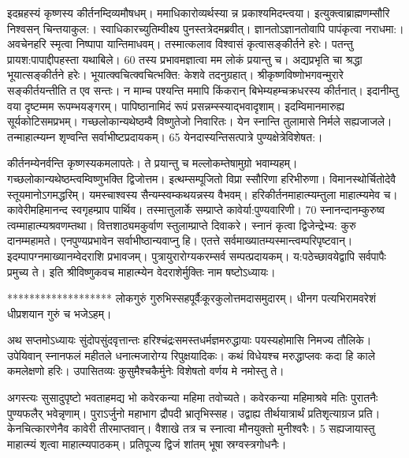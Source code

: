 इदम्रहस्यं कृष्णस्य कीर्तनम्दिव्यमौषधम्।
 ममाधिकारोव्यर्थस्या न्न प्रकाश्यमिदम्त्वया।
 इत्युक्त्वाब्राह्मणम्सौरि निश्वसन् चिन्तयाकुल:।
 स्वाधिकारच्युतिम्वीक्ष्य पुनस्तत्रेदमब्रवीत्।
 ज्ञानतोऽज्ञानतोवापि पापंकृत्वा नराधमा:।
 अवचेनहरि स्मृत्वा निष्पापा यान्तिमाधवम्।
 तस्मात्कलाव विश्वासं कृत्वासङ्कीर्तने हरेः।
 पतन्तु प्रायश:पापाद्दीपहस्ता यथाबिले।
 60 तस्य प्रभावमज्ञात्वा मम लोकं प्रयान्तु च।
 अद्यप्रभृति चा श्रद्धा भूयात्सङ्कीर्तने हरेः।
 भूयात्क्वचित्क्वचित्भक्ति: केशवे तदनुग्रहात्।
 श्रीकृष्णविष्णोभगवन्मुरारे
सङ्कीर्तयन्तीति त एव सन्तः।
 न माम्च पश्यन्ति ममापि
किंकरान् बिभेम्यहम्चक्रधरस्य कीर्तनात्।
 इदानीम्तु वया दृष्टम्मम रूपम्भयङ्गरम्।
 पापिष्ठानामिदं रूपं प्रसन्नम्स्स्याद्भवादृशाम्।
 इदम्विमानमारुह्य सूर्यकोटिसमप्रभम्।
 गच्छलोकान्यथेष्ठम्वै विष्णुतेजो निवारितः।
 येन स्नान्ति तुलामासे निर्मले सह्यजाजले।
 तन्माहात्म्यम्न शृण्वन्ति सर्वाभीष्टप्रदायकम्।
 65 येनदास्यन्तिसत्पात्रे पुण्यक्षेत्रेविशेषत:।
 
कीर्तनम्येनर्वन्ति कृष्णस्यकमलापतेः।
 ते प्रयान्तु च मल्लोकम्तेषामुग्रो भवाम्यहम्।
 गच्छलोकान्यथेष्ठम्त्वम्विष्णुभक्ति द्विजोत्तम।
 इत्थम्सम्पूजितो विप्रा स्सौरिणा हरिभीरुणा।
 विमानस्थोर्चितोदेवै स्तूयमानोऽगमद्धरिम्।
 यमस्चाश्वस्य सैन्यम्स्वम्कथयन्नस्य वैभवम्।
 हरिकीर्तनमाहात्म्यम्तुला माहात्म्यमेव च।
 कावेरीमहिमानन्द स्वगृहम्प्राप पार्थिव।
 तस्मात्तुलार्के सम्प्राप्ते कावेर्या:पुण्यवारिणी।
 70 स्नानन्दानम्कुरुष्व त्वम्माहात्म्यश्रवणम्तथा।
 वित्तशाठ्यमकुर्वाण स्तुलाम्प्राप्ते दिवाकरे।
 स्नानं कृत्वा द्विजेन्द्रेभ्य: कुरु दानम्महामते।
 एनपुण्यप्रभावेन सर्वाभीष्ठान्यवाप्नु हि।
 एतत्ते सर्वमाख्यातम्यस्मान्त्वम्परिपृष्टवान्।
 इदम्पापग्नमाख्यानम्वेदराशि प्रभावजम्।
 पुत्रायुरारोग्यकरम्सर्व सम्पत्प्रदायकम्।
 य:पठेच्छावयेद्वापि सर्वपापैः प्रमुच्य ते।
 इति श्रीविष्णुकवच माहात्म्येन वेदराशेर्मुक्तिः नाम
षष्टोऽध्यायः।

*******************
लोकगुरुं गुरुभिस्सहपूर्वैःकूरकुलोत्तमदासमुदारम्।
 धीनग पत्यभिरामवरेशं धीप्रशयान गुरुं च भजेऽहम्।
 
अथ सप्तमोऽध्यायः
सुंदोपसुंदवृत्तान्तः हरिश्चंद्रःसमस्तधर्मज्ञमरुद्धायाः
पयस्यहोमासि निमज्य तौलिके।
 उपेयिवान् स्नानफलं महीतले
धनात्मजारोग्य रिपुक्षयादिकः।
 कथं विधेयश्च मरुद्धाप्लवः कदा हि
काले कमलेक्षणो हरिः।
 उपासितव्यः कुसुमैश्चकैर्मुनेः विशेषतो
वर्णय मे नमोस्तु ते।

अगस्त्यः
सुसादुपृष्टो भवताहमद्य भो कवेरकन्या महिमा तवोच्यते।
 कवेरकन्या महिमाश्रवे मतिः पुरातनैः
पुण्यफलैर् भवेन्नृणाम्।
 पुराऽर्जुनो महाभाग द्रौपदी भ्रातृभिस्सह।
 उद्वाह्य तीर्थयात्रार्थं प्रतिशृत्याग्रज प्रति।
 केनचित्कारणेनैव कावेरी तीरमाप्तवान्।
 वैशाखे तत्र च स्नात्वा मौनयुक्तो मुनीश्वरैः।
 5 सह्यजायास्तु माहात्म्यं शृत्वा माहात्म्यपाठकम्।
 प्रतिपूज्य द्विजं शांतम् भूषा स्रग्वस्त्रगोधनैः।
 
